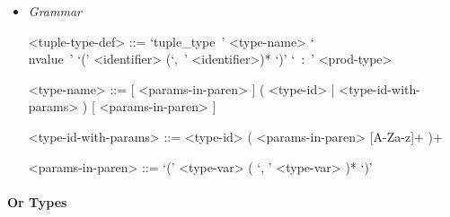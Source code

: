 \documentclass{article}
\begin{document}
\begin{itemize}
\item \textit{Grammar}

\begin{grammar}
<tuple-type-def> ::= 
`tuple_type\ ' <type-name>
`\\nvalue\ ' `(' <identifier> (`,\ ' <identifier>)* `)' `\ :\ ' <prod-type>

<type-name> ::= 
[ <params-in-paren> ] ( <type-id> | <type-id-with-params> ) [ <params-in-paren> ]

<type-id-with-params> ::= 
<type-id> ( <params-in-paren> [A-Za-z]+ )+

<params-in-paren> ::= `(' <type-var> ( `, ' <type-var> )* `)'
\end{grammar}

\end{itemize}

\paragraph{Or Types}
\end{document}
